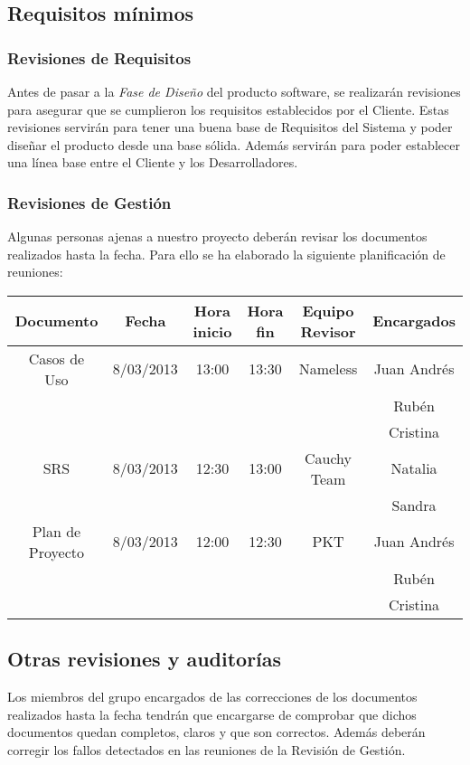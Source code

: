\documentclass[11pt, a4paper, twoside, titlepage]{article}
\begin{document}
		\subsection{Requisitos mínimos}
			\subsubsection{Revisiones de Requisitos}
				Antes de pasar a la \textit{Fase de Diseño} del producto software, se realizarán revisiones para asegurar que se
				cumplieron los requisitos establecidos por el Cliente. Estas revisiones servirán para tener una buena base de 
				Requisitos del Sistema y poder diseñar el producto desde una base sólida. Además servirán para poder establecer una línea 
				base entre el Cliente y los Desarrolladores. 
				
			\subsubsection{Revisiones de Gestión}
			Algunas personas ajenas a nuestro proyecto deberán revisar los documentos realizados hasta la fecha. Para ello se ha elaborado 
			la siguiente planificación de reuniones: \\
			
			\begin{center}
				\begin{tabular}{|c |c |c |c |c| c|}
				\hline
				\textbf{Documento} & \textbf{Fecha} &\textbf{Hora inicio} & \textbf{Hora fin}& \textbf{Equipo Revisor} & \textbf{Encargados}\\
				\hline
				Casos de Uso & 8/03/2013 & 13:00 & 13:30 & Nameless & Juan Andrés\\
										 &					 &			 &			 &					& Rubén\\
										 &					 &			 &			 &					& Cristina\\
				\hline
				SRS & 8/03/2013 & 12:30 & 13:00 & Cauchy Team & Natalia\\
				    &						&				&				&							& Sandra\\
				\hline
				Plan de Proyecto & 8/03/2013 & 12:00 & 12:30 & PKT & Juan Andrés\\
												 &					 &			 &			 &		 & Rubén\\
												 &					 &			 &			 &		 & Cristina\\
				\hline
				\end{tabular}
			\end{center}
			
			
		\subsection{Otras revisiones y auditorías}
		Los miembros del grupo encargados de las correcciones de los documentos realizados hasta la fecha tendrán que encargarse
		de comprobar que dichos documentos quedan completos, claros y que son correctos. Además deberán corregir los fallos detectados
		en las reuniones de la Revisión de Gestión. \\
		
\end{document}

